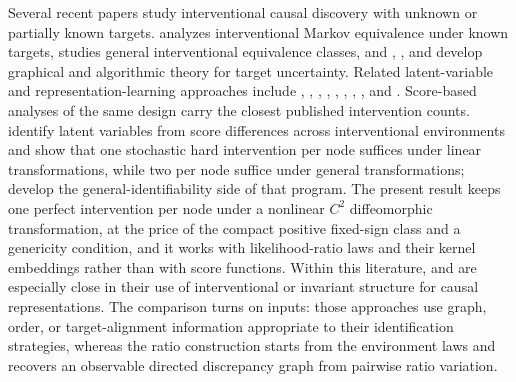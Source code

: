 \documentclass[11pt]{article}
\begin{document}
Several recent papers study interventional causal discovery with unknown or partially known targets. \citet{Hauser2012} analyzes interventional Markov equivalence under known targets, \citet{Yang2018} studies general interventional equivalence classes, and \citet{JaberEtAl2020SoftUnknownTargets}, \citet{Dai2025}, and \citet{Zhang2026} develop graphical and algorithmic theory for target uncertainty. Related latent-variable and representation-learning approaches include \citet{Kivva2021}, \citet{Xie2024}, \citet{JiangAragam2023UnknownInterventions}, \citet{BuchholzEtAl2023LinearCausalRepresentations}, \citet{AhujaEtAl2023InterventionalCRL}, \citet{Varici2024}, \citet{VariciEtAl2025ScoreBasedCRL}, \citet{Bing2024}, and \citet{NgEtAl2025GeneralEnvironments}. Score-based analyses of the same design carry the closest published intervention counts. \citet{VariciEtAl2025ScoreBasedCRL} identify latent variables from score differences across interventional environments and show that one stochastic hard intervention per node suffices under linear transformations, while two per node suffice under general transformations; \citet{Varici2024} develop the general-identifiability side of that program. The present result keeps one perfect intervention per node under a nonlinear \(C^2\) diffeomorphic transformation, at the price of the compact positive fixed-sign class and a genericity condition, and it works with likelihood-ratio laws and their kernel embeddings rather than with score functions. Within this literature, \citet{WendongEtAl2023CauCA} and \citet{YaoEtAl2025InvariancePrinciple} are especially close in their use of interventional or invariant structure for causal representations. The comparison turns on inputs: those approaches use graph, order, or target-alignment information appropriate to their identification strategies, whereas the ratio construction starts from the environment laws and recovers an observable directed discrepancy graph from pairwise ratio variation.
\end{document}
